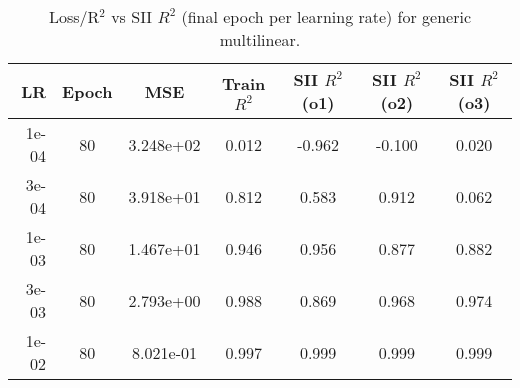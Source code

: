 \begin{table}[t]
\centering
\small
\begin{tabular}{rcccccc}
\toprule
LR & Epoch & MSE & Train $R^2$ & SII $R^2$ (o1) & SII $R^2$ (o2) & SII $R^2$ (o3) \\
\midrule
1e-04 & 80 & 3.248e+02 & 0.012 & -0.962 & -0.100 & 0.020 \\
3e-04 & 80 & 3.918e+01 & 0.812 & 0.583 & 0.912 & 0.062 \\
1e-03 & 80 & 1.467e+01 & 0.946 & 0.956 & 0.877 & 0.882 \\
3e-03 & 80 & 2.793e+00 & 0.988 & 0.869 & 0.968 & 0.974 \\
1e-02 & 80 & 8.021e-01 & 0.997 & 0.999 & 0.999 & 0.999 \\
\bottomrule
\end{tabular}
\caption{Loss/R$^2$ vs SII $R^2$ (final epoch per learning rate) for generic multilinear.}
\label{tab:lr-vs-sii}
\end{table}